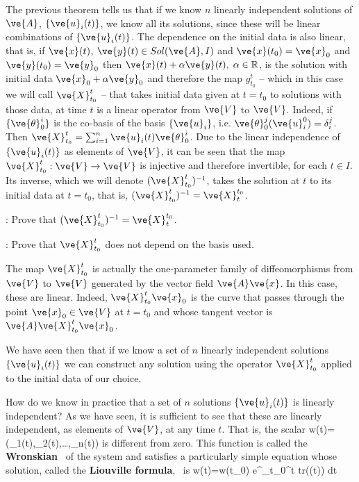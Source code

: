 The previous theorem tells us that if we know $n$ linearly independent solutions of $\ve{A}$, $\{\ve{u}_i(t)\}$, we know all its solutions, since these will be linear combinations of $\{\ve{u}_i(t)\}$. The dependence on the initial data is also linear, that is, if $\ve{x}(t)$, $\ve{y}(t) \in Sol(\ve{A},I)$ and $\ve{x}(t_0)=\ve{x}_0$ and $\ve{y}(t_0)=\ve{y}_0$ then $\ve{x}(t)+\alpha \ve{y}(t), \; \alpha \in \mathbb{R}$, is the solution with initial data $\ve{x}_0+\alpha \ve{y}_0$ and therefore the map $g^t_{t_0}$ -- which in this case we will call $\ve{X}_{t_0}^t$ -- that takes initial data given at $t=t_0$ to solutions with those data, at time $t$ is a linear operator from $\ve{V}$ to $\ve{V}$. 
Indeed, if $\{\ve{\theta}_0^i\}$ is the co-basis of the basis $\{\ve{u}_i\}$, i.e. $\ve{\theta}_0^j(\ve{u}_i^0)=\delta^j_i$. 
Then $\ve{X}_{t_0}^t = \sum_{i=1}^n \ve{u}_i(t) \ve{\theta}^i_0$. 
Due to the linear independence of $\{\ve{u}_i(t)\}$ as elements of $\ve{V}$, it can be seen that the map $\ve{X}_{t_0}^t: \ve{V} \to \ve{V}$ is injective and therefore invertible, for each $t \in I$. Its inverse, which we will denote $(\ve{X}_{t_0}^t)^{-1}$, takes the solution at $t$ to its initial data at $t=t_0$, that is, $(\ve{X}_{t_0}^t)^{-1}=\ve{X}_t^{t_0}$.

\espa
\ejer:
Prove that $(\ve{X}_{t_0}^t)^{-1}=\ve{X}_t^{t_0}$.

\ejer:
Prove that $\ve{X}_{t_0}^t$ does not depend on the basis used.
\espa

The map $\ve{X}_{t_0}^t$ is actually the one-parameter family of diffeomorphisms from $\ve{V}$ to $\ve{V}$ generated by the vector field $\ve{A}\ve{x}$. 
In this case, these are linear. 
Indeed, $\ve{X}_{t_0}^t \ve{x}_0$ is the curve that passes through the point $\ve{x}_0 \in \ve{V}$ at $t=t_0$ and whose tangent vector is $\ve{A} \ve{X}_{t_0}^t \ve{x}_0$.

We have seen then that if we know a set of $n$ linearly independent solutions $\{\ve{u}_i(t)\}$ we can construct any solution using the operator $\ve{X}_{t_0}^t$ applied to the initial data of our choice.

How do we know in practice that a set of $n$ solutions $\{\ve{u}_i(t)\}$ is linearly independent? As we have seen, it is sufficient to see that these are linearly independent, as elements of $\ve{V}$, at any time $t$. That is, the scalar
\beq
w(t)=\varepsilon(_1(t),_2(t),\ldots,_n(t))
\eeq
\noi is different from zero. This function is called the {\bf Wronskian}~ of the system and satisfies a particularly simple equation whose solution, called the {\bf Liouville formula},~ is 
\beq
w(t)=w(t_0) e^{\dip\int_{t_0}^t tr((\tilde t)) d\tilde t}
\label{5.2}
\eeq
\espa

